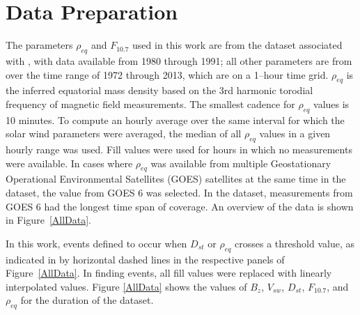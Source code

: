 \documentclass[10pt,twocolumn]{article}
\begin{document}



\section{Data Preparation}

The parameters $\rho_{eq}$ and $F_{10.7}$ used in this work are from the dataset associated with \cite{Denton}, with data available from 1980 through 1991; all other parameters are from \cite{Reconstruction} over the time range of 1972 through 2013, which are on a 1--hour time grid. $\rho_{eq}$ is the inferred equatorial mass density based on the 3rd harmonic torodial frequency of magnetic field measurements.  The smallest cadence for $\rho_{eq}$ values is 10 minutes.  To compute an hourly average over the same interval for which the solar wind parameters were averaged, the median of all $\rho_{eq}$ values in a given hourly range was used.  Fill values were used for hours in which no measurements were available.  In cases where $\rho_{eq}$ was available from multiple Geostationary Operational Environmental Satellites (GOES) satellites at the same time in the \cite{Denton} dataset, the value from GOES 6 was selected.  In the dataset, measurements from GOES 6 had the longest time span of coverage.  An overview of the data is shown in Figure~\ref{AllData}.


In this work, events defined to occur when $D_{st}$ or $\rho_{eq}$ crosses a threshold value, as indicated in by horizontal dashed lines in the respective panels of Figure~\ref{AllData}.  In finding events, all fill values were replaced with linearly interpolated values.  Figure \ref{AllData} shows the values of $B_z$, $V_{sw}$, $D_{st}$, $F_{10.7}$, and $\rho_{eq}$ for the duration of the dataset. 
\end{document}
